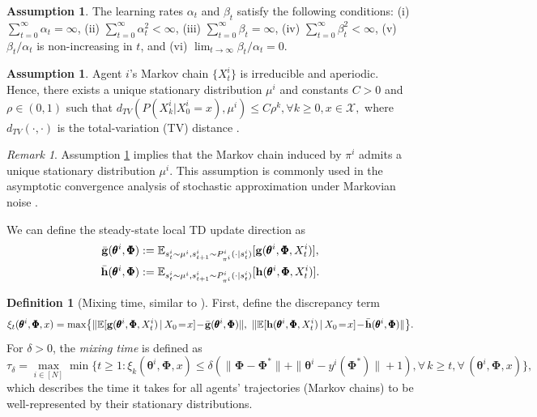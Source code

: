 \documentclass{article} %
\theoremstyle{plain}
\theoremstyle{definition}
\newtheorem{definition}[theorem]{Definition}
\newtheorem{assumption}[theorem]{Assumption}
\theoremstyle{remark}
\newtheorem{remark}[theorem]{Remark}
\newcommand{\cX}{\mathcal{X}}
\begin{document}
\begin{assumption}\label{assumptions:lr}
The learning rates $\alpha_t$ and $\beta_t$ satisfy the following conditions: (i) $\sum_{t=0}^\infty \alpha_t=\infty$, (ii) $\sum_{t=0}^\infty \alpha_t^2<\infty$, (iii) $\sum_{t=0}^\infty \beta_t=\infty$, (iv) $\sum_{t=0}^\infty \beta_t^2<\infty$, (v) $\beta_t/\alpha_t$ is non-increasing in $t$, and (vi) $\lim_{t\rightarrow\infty}\beta_t/\alpha_t=0$. 
\end{assumption}

\begin{assumption}\label{assumption:markovian}
Agent $i$'s Markov chain $\{X_t^i\}$  is irreducible and aperiodic.
Hence, there exists a unique stationary distribution $\mu^i$ \citep{levin2017markov}  and  constants $C>0$ and $\rho\in(0,1)$ such that 
    $d_{TV}(P(X_k^i|X^i_0=x), \mu^i)\leq C\rho^k, \forall k\geq 0, x\in\cX,$
where $d_{TV}(\cdot,\cdot)$ is the total-variation (TV) distance \citep{levin2017markov}. 

\end{assumption}

\begin{remark}
Assumption \ref{assumption:markovian} implies that the Markov chain induced by $\pi^i$ admits a unique stationary distribution $\mu^i$. This assumption is commonly used in the asymptotic convergence analysis of stochastic approximation under Markovian noise \citep{borkar2009stochastic,chen2019performance}.
\end{remark}


We can define the steady-state local TD update direction as
\begin{align}
    \bar{\bg}(\pmb{\theta}^i, \pmb{\Phi})&:=\mathbb{E}_{s_t^i\sim\mu^i, s_{t+1}^i\sim P^i_{\pi^i}(\cdot|s_t^i)}[\bg(\pmb{\theta}^i, \pmb{\Phi}, X_{t}^i)],\nonumber\allowdisplaybreaks\\
    \bar{\bh}(\pmb{\theta}^i, \pmb{\Phi})&:=\mathbb{E}_{s_t^i\sim\mu^i, s_{t+1}^i\sim P^i_{\pi^i}(\cdot|s_t^i)}[\bh(\pmb{\theta}^i, \pmb{\Phi}, X_{t}^i)].
\end{align}



\begin{definition} [Mixing time, similar to \cite{chen2019performance}]\label{def:mixing}
 First, define the discrepancy term
 \[
 \xi_t(\pmb{\theta}^i, \pmb{\Phi}, x) = \max \bigl \{ \|\mathbb{E}[\bg(\pmb{\theta}^i, \pmb{\Phi},X_t^i)\,|\,X_0\!=\!x]\!-\!\bar{\bg}(\pmb{\theta}^i,\pmb{\Phi}) \|, ~\|\mathbb{E}[\bh(\pmb{\theta}^i, \pmb{\Phi},X_t^i)\,|\,X_0\!=\!x]\!-\!\bar{\bh}(\pmb{\theta}^i,\pmb{\Phi}) \| \bigr\}.
 \]
 For $\delta > 0 $, the \emph{mixing time} is defined as
 \[
 \tau_\delta = \max_{i \in [N]} \min \bigl\{t \ge 1: \xi_k(\pmb{\theta}^i, \pmb{\Phi}, x) \le \delta (\|\pmb{\Phi}-\pmb{\Phi}^*\|+\|\pmb{\theta}^i-y^i(\pmb{\Phi}^*)\|+1), \forall \, k \ge t, \forall \, (\pmb{\theta}^i, \pmb{\Phi}, x) \bigr\},
 \]
 which describes the time it takes for all agents' trajectories (Markov chains) to be well-represented by their stationary distributions.
 \end{definition}
\end{document}

